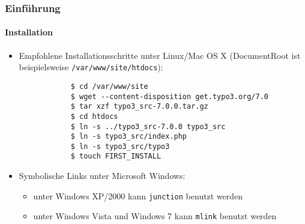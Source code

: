 \begin{frame}[fragile]
	\frametitle{Einführung}
	\framesubtitle{Installation}

	\begin{itemize}
		\item Empfohlene Installationsschritte unter Linux/Mac OS X\newline
			(DocumentRoot ist beispielsweise \texttt{/var/www/site/htdocs}):
		\begin{lstlisting}
			$ cd /var/www/site
			$ wget --content-disposition get.typo3.org/7.0
			$ tar xzf typo3_src-7.0.0.tar.gz
			$ cd htdocs
			$ ln -s ../typo3_src-7.0.0 typo3_src
			$ ln -s typo3_src/index.php
			$ ln -s typo3_src/typo3
			$ touch FIRST_INSTALL
		\end{lstlisting}

		\item Symbolische Links unter Microsoft Windows:

			\begin{itemize}
				\item unter Windows XP/2000 kann \texttt{junction} benutzt werden
				\item unter Windows Vista und Windows 7 kann \texttt{mlink} benutzt werden
			\end{itemize}

	\end{itemize}
\end{frame}


